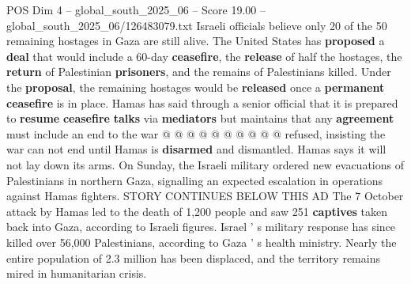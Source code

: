 \begin{textsample}{POS Dim 4 – global\_south\_2025\_06 – Score 19.00 – global\_south\_2025\_06/126483079.txt}
Israeli officials believe only 20 of the 50 remaining hostages in Gaza are still alive.
The United States has \textbf{proposed} a \textbf{deal} that would include a 60-day \textbf{ceasefire}, the \textbf{release} of half the hostages, the \textbf{return} of Palestinian \textbf{prisoners}, and the remains of Palestinians killed.
Under the \textbf{proposal}, the remaining hostages would be \textbf{released} once a \textbf{permanent} \textbf{ceasefire} is in place.
Hamas has said through a senior official that it is prepared to \textbf{resume} \textbf{ceasefire} \textbf{talks} via \textbf{mediators} but maintains that any \textbf{agreement} must include an end to the war @ @ @ @ @ @ @ @ @ @ refused, insisting the war can not end until Hamas is \textbf{disarmed} and dismantled.
Hamas says it will not lay down its arms.
On Sunday, the Israeli military ordered new evacuations of Palestinians in northern Gaza, signalling an expected escalation in operations against Hamas fighters.
STORY CONTINUES BELOW THIS AD The 7 October attack by Hamas led to the death of 1,200 people and saw 251 \textbf{captives} taken back into Gaza, according to Israeli figures.
Israel ' s military response has since killed over 56,000 Palestinians, according to Gaza ' s health ministry.
Nearly the entire population of 2.3 million has been displaced, and the territory remains mired in humanitarian crisis.

\end{textsample}
